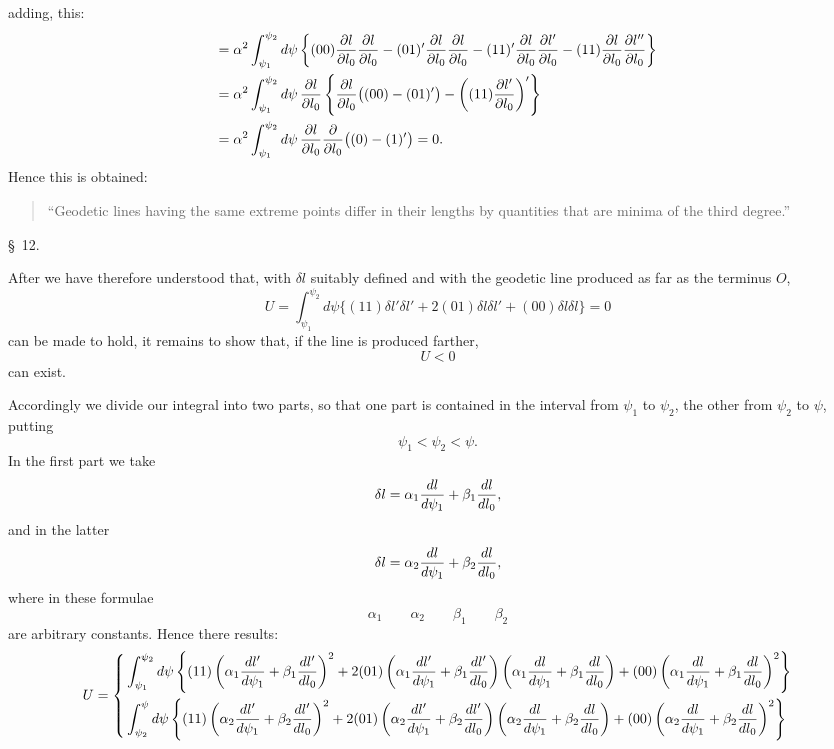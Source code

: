 adding, this:
\[
\begin{aligned}
={}&\alpha^2\int_{\psi_1}^{\psi_2}d\psi\left\{(00){\partial l\over \partial l_0}{\partial l\over \partial l_0}
-(01)'{\partial l\over \partial l_0}{\partial l\over \partial l_0}
-(11)'{\partial l\over \partial l_0}{\partial l'\over \partial l_0}
-(11){\partial l\over \partial l_0}{\partial l''\over \partial l_0}\right\}\\
={}&\alpha^2\int_{\psi_1}^{\psi_2}d\psi\,{\partial l\over \partial l_0}
\left\{{\partial l\over \partial l_0}\bigl((00)-(01)'\bigr)-\left((11){\partial l'\over \partial l_0}\right)'\right\}\\
={}&\alpha^2\int_{\psi_1}^{\psi_2}d\psi\,{\partial l\over \partial l_0}{\partial\over \partial l_0}\bigl((0)-(1)'\bigr)=0.
\end{aligned}
\]
Hence this is obtained:
\begin{quote}
``Geodetic lines having the same extreme points differ in their lengths by quantities that are minima of the third degree.''
\end{quote}

\begin{center}\S\ 12.\end{center}

After we have therefore understood that, with $\delta l$ suitably defined and with the geodetic line produced as far as the terminus $O$,
\[
 U=\int_{\psi_1}^{\psi_2}d\psi\{(11)\delta l'\delta l'+2(01)\delta l\delta l'+(00)\delta l\delta l\}=0
\]
can be made to hold, it remains to show that, if the line is produced farther,
\[
 U<0
\]
can exist.

Accordingly we divide our integral into two parts, so that one part is contained in the interval from $\psi_1$ to $\psi_2$, the other from $\psi_2$ to $\psi$, putting
\[
 \psi_1<\psi_2<\psi.
\]
In the first part we take
\[
 \delta l=\alpha_1{dl\over d\psi_1}+\beta_1{dl\over dl_0},
\]
and in the latter
\[
 \delta l=\alpha_2{dl\over d\psi_1}+\beta_2{dl\over dl_0},
\]
where in these formulae
\[
 \alpha_1\qquad \alpha_2\qquad \beta_1\qquad \beta_2
\]
are arbitrary constants. Hence there results:
\begingroup\tiny
\[
\begin{aligned}
U=\left\{\begin{aligned}
&\int_{\psi_1}^{\psi_2}d\psi\left\{(11)\left(\alpha_1{dl'\over d\psi_1}+\beta_1{dl'\over dl_0}\right)^2
+2(01)\left(\alpha_1{dl'\over d\psi_1}+\beta_1{dl'\over dl_0}\right)\left(\alpha_1{dl\over d\psi_1}+\beta_1{dl\over dl_0}\right)
+(00)\left(\alpha_1{dl\over d\psi_1}+\beta_1{dl\over dl_0}\right)^2\right\}\\
&\int_{\psi_2}^{\psi}d\psi\left\{(11)\left(\alpha_2{dl'\over d\psi_1}+\beta_2{dl'\over dl_0}\right)^2
+2(01)\left(\alpha_2{dl'\over d\psi_1}+\beta_2{dl'\over dl_0}\right)\left(\alpha_2{dl\over d\psi_1}+\beta_2{dl\over dl_0}\right)
+(00)\left(\alpha_2{dl\over d\psi_1}+\beta_2{dl\over dl_0}\right)^2\right\}
\end{aligned}\right.
\end{aligned}
\]
\endgroup
